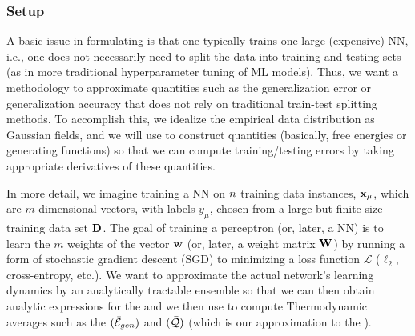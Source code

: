 \subsubsection{Setup}
\label{sxn:mathP_setup}

A basic issue in formulating \SETOL is that one typically trains one large (expensive) NN, i.e., one does not necessarily  need to split the data into training and testing sets (as in more traditional hyperparameter tuning of ML models).
Thus, we want a methodology to approximate quantities such as the generalization error or generalization accuracy that does not rely on traditional train-test splitting methods.
To accomplish this, we idealize the empirical data distribution as Gaussian fields, and we will use \STATMECH to construct quantities (basically, free energies or generating functions) so that we can compute training/testing errors by taking appropriate derivatives of these quantities.

In more detail, we imagine training a NN on $n$ training data instances, ${\mathbf{x}}_{\mu}$, which are $m$-dimensional vectors,
with labels $y_{\mu}$, chosen from a large but finite-size training data set $\mathbf{D}$.
The goal of training a perceptron (or, later, a NN) is to learn the $m$ weights of the vector ${\mathbf{w}}$ (or, later, a weight matrix ${\mathbf{W}}$) by running a form of stochastic gradient descent (SGD) to minimizing a loss function $\mathcal{L}$ ($\ell_2$, cross-entropy, etc.). 
We want to approximate the actual network’s learning dynamics by an analytically tractable ensemble
so that we can then obtain 
analytic expressions for the \emph{\FreeEnergy} and \emph{\GeneratingFunction} we then use to compute
Thermodynamic averages such as the \emph{\AverageGeneralizationError} $(\bar{\mathcal{E}}_{gen})$ and
\emph{\ModelQuality} $(\bar{\mathcal{Q}})$ (which is our approximation to the \emph{\AverageGeneralizationAccuracy}).



